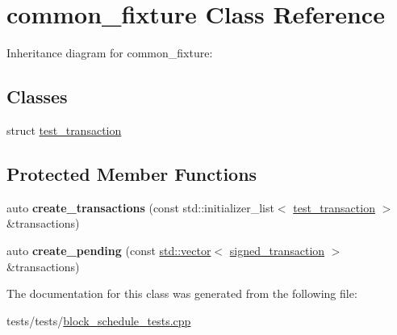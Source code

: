 \hypertarget{classcommon__fixture}{}\section{common\+\_\+fixture Class Reference}
\label{classcommon__fixture}


Inheritance diagram for common\+\_\+fixture\+:
\subsection*{Classes}
\begin{DoxyCompactItemize}
\item 
struct \mbox{\hyperlink{structcommon__fixture_1_1test__transaction}{test\+\_\+transaction}}
\end{DoxyCompactItemize}
\subsection*{Protected Member Functions}
\begin{DoxyCompactItemize}
\item 
\mbox{\label{classcommon__fixture_a45621f22c7999b34016de3115a1ecd55}} 
auto {\bfseries create\+\_\+transactions} (const std\+::initializer\+\_\+list$<$ \mbox{\hyperlink{structcommon__fixture_1_1test__transaction}{test\+\_\+transaction}} $>$ \&transactions)
\item 
\mbox{\label{classcommon__fixture_a8ce7f9091c1b0c29f591028b49347b1d}} 
auto {\bfseries create\+\_\+pending} (const \mbox{\hyperlink{classstd_1_1vector}{std\+::vector}}$<$ \mbox{\hyperlink{structaacio_1_1chain_1_1signed__transaction}{signed\+\_\+transaction}} $>$ \&transactions)
\end{DoxyCompactItemize}


The documentation for this class was generated from the following file\+:\begin{DoxyCompactItemize}
\item 
tests/tests/\mbox{\hyperlink{block__schedule__tests_8cpp}{block\+\_\+schedule\+\_\+tests.\+cpp}}\end{DoxyCompactItemize}
